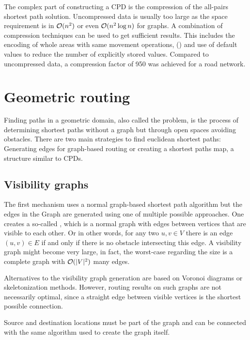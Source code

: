 			The complex part of constructing a CPD is the compression\cite{botea-cpd-2013} of the all-pairs shortest path solution.
			Uncompressed data is usually too large as the space requirement is in $\mathcal{O}(n^2)$ or even $\mathcal{O}(n^2 \log n)$ for graphs.
			A combination of compression techniques can be used to get sufficient results.
			This includes the encoding of whole areas with same movement operations,  () and use of default values to reduce the number of explicitly stored values\cite{botea-cpd-2013}.
			Compared to uncompressed data, a compression factor of 950 was achieved for a road network.
	
\section{Geometric routing}
\label{sec:geometric-routing}

	Finding paths in a geometric domain, also called the  problem, is the process of determining shortest paths without a graph but through open spaces avoiding obstacles.
	There are two main strategies to find euclidean shortest paths:
	Generating edges for graph-based routing or creating a shortest paths map, a structure similar to CPDs.
	
	\subsection{Visibility graphs}
	\label{subsec:visibility-graph}
	
		The first mechanism uses a normal graph-based shortest path algorithm but the edges in the Graph are generated using one of multiple possible approaches.
		One creates a so-called , which is a normal graph with edges between vertices that are visible to each other.
		Or in other words, for any two $u, v \in V$ there is an edge $(u, v) \in E$ if and only if there is no obstacle intersecting this edge.
		A visibility graph might become very large, in fact, the worst-case regarding the size is a complete graph with $\mathcal{O}(|V|^2)$ many edges.
		
		Alternatives to the visibility graph generation are based on Voronoi diagrams or skeletonization methods.
		However, routing results on such graphs are not necessarily optimal\cite{graser-osm-open-spaces}, since a straight edge between visible vertices is the shortest possible connection.
		
		Source and destination locations must be part of the graph and can be connected with the same algorithm used to create the graph itself.
	
